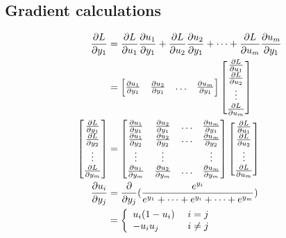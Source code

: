 \subsection{Gradient calculations}
\begin{equation}
\begin{aligned}
\frac{\partial L}{\partial y_{1}} & = \frac{\partial L}{\partial u_{1}}\frac{\partial u_{1}}{\partial y_{1}} + 
									\frac{\partial L}{\partial u_{2}}\frac{\partial u_{2}}{\partial y_{1}} +
									\dots +  
									\frac{\partial L}{\partial u_{m}}\frac{\partial u_{m}}{\partial y_{1}}   \\
								 & = 		
								 \begin{bmatrix}
									 \frac{\partial u_{1}}{\partial y_{1}}  & \frac{\partial u_{2}}{\partial y_{1}}  &  \dots  & 
									 \frac{\partial u_{m}}{\partial y_{1}} \\
								 \end{bmatrix}	
								 \begin{bmatrix}
									 \frac{\partial L}{\partial u_{1}} \\
									 \frac{\partial L}{\partial u_{2}} \\
									 \vdots \\ 
									 \frac{\partial L}{\partial u_{m}}
								 \end{bmatrix} \\
\begin{bmatrix} 
\frac{\partial L}{\partial y_{1}} \\
\frac{\partial L}{\partial y_{2}} \\
\vdots \\
\frac{\partial L}{\partial y_{m}} 
\end{bmatrix} & = 	
\begin{bmatrix}
\frac{\partial u_{1}}{\partial y_{1}}  & \frac{\partial u_{2}}{\partial y_{1}}  &  \dots  & \frac{\partial u_{m}}{\partial y_{1}} \\
\frac{\partial u_{1}}{\partial y_{2}}  & \frac{\partial u_{2}}{\partial y_{2}}  &  \dots  & \frac{\partial u_{m}}{\partial y_{2}} \\
\vdots 	                               & \vdots                                 &         & \vdots \\ 
\frac{\partial u_{1}}{\partial y_{m}}  & \frac{\partial u_{2}}{\partial y_{m}}  &  \dots  & \frac{\partial u_{m}}{\partial y_{m}} 
\end{bmatrix} 	
\begin{bmatrix}
\frac{\partial L}{\partial u_{1}} \\
\frac{\partial L}{\partial u_{2}} \\
\vdots \\ 
\frac{\partial L}{\partial u_{m}}
\end{bmatrix}  \\
\frac{\partial u_i}{\partial y_j} & = \frac{\partial}{\partial y_j} (\frac{e^{y_i}}{e^{y_1}+\dots + e^{y_i}+\dots+e^{y_m}})\\
								  & = \left\{ \begin{array}{ll} u_i(1-u_i) & \mbox{ } i=j \\ -u_i u_j & \mbox{ } i \neq j \end{array} \right. \\  		  
\end{aligned}
\end{equation}

